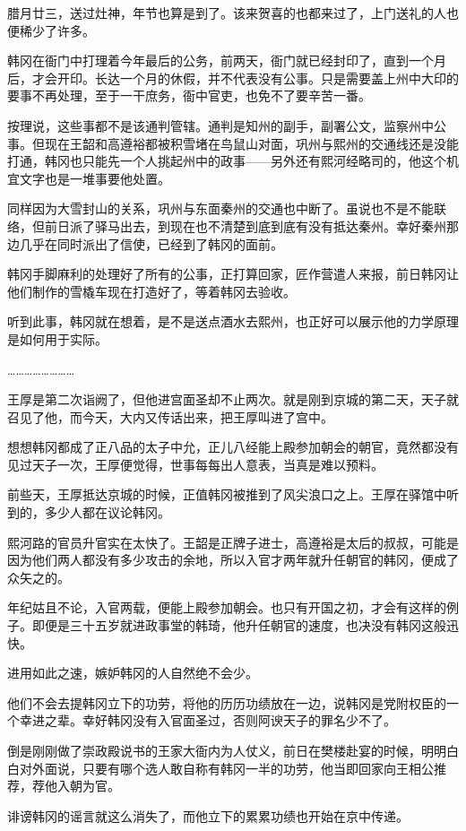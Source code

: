 腊月廿三，送过灶神，年节也算是到了。该来贺喜的也都来过了，上门送礼的人也便稀少了许多。

韩冈在衙门中打理着今年最后的公务，前两天，衙门就已经封印了，直到一个月后，才会开印。长达一个月的休假，并不代表没有公事。只是需要盖上州中大印的要事不再处理，至于一干庶务，衙中官吏，也免不了要辛苦一番。

按理说，这些事都不是该通判管辖。通判是知州的副手，副署公文，监察州中公事。但现在王韶和高遵裕都被积雪堵在鸟鼠山对面，巩州与熙州的交通线还是没能打通，韩冈也只能先一个人挑起州中的政事——另外还有熙河经略司的，他这个机宜文字也是一堆事要他处置。

同样因为大雪封山的关系，巩州与东面秦州的交通也中断了。虽说也不是不能联络，但前日派了驿马出去，到现在也不清楚到底到底有没有抵达秦州。幸好秦州那边几乎在同时派出了信使，已经到了韩冈的面前。

韩冈手脚麻利的处理好了所有的公事，正打算回家，匠作营遣人来报，前日韩冈让他们制作的雪橇车现在打造好了，等着韩冈去验收。

听到此事，韩冈就在想着，是不是送点酒水去熙州，也正好可以展示他的力学原理是如何用于实际。

……………………

王厚是第二次诣阙了，但他进宫面圣却不止两次。就是刚到京城的第二天，天子就召见了他，而今天，大内又传话出来，把王厚叫进了宫中。

想想韩冈都成了正八品的太子中允，正儿八经能上殿参加朝会的朝官，竟然都没有见过天子一次，王厚便觉得，世事每每出人意表，当真是难以预料。

前些天，王厚抵达京城的时候，正值韩冈被推到了风尖浪口之上。王厚在驿馆中听到的，多少人都在议论韩冈。

熙河路的官员升官实在太快了。王韶是正牌子进士，高遵裕是太后的叔叔，可能是因为他们两人都没有多少攻击的余地，所以入官才两年就升任朝官的韩冈，便成了众矢之的。

年纪姑且不论，入官两载，便能上殿参加朝会。也只有开国之初，才会有这样的例子。即便是三十五岁就进政事堂的韩琦，他升任朝官的速度，也决没有韩冈这般迅快。

进用如此之速，嫉妒韩冈的人自然绝不会少。

他们不会去提韩冈立下的功劳，将他的历历功绩放在一边，说韩冈是党附权臣的一个幸进之辈。幸好韩冈没有入官面圣过，否则阿谀天子的罪名少不了。

倒是刚刚做了崇政殿说书的王家大衙内为人仗义，前日在樊楼赴宴的时候，明明白白对外面说，只要有哪个选人敢自称有韩冈一半的功劳，他当即回家向王相公推荐，荐他入朝为官。

诽谤韩冈的谣言就这么消失了，而他立下的累累功绩也开始在京中传递。


